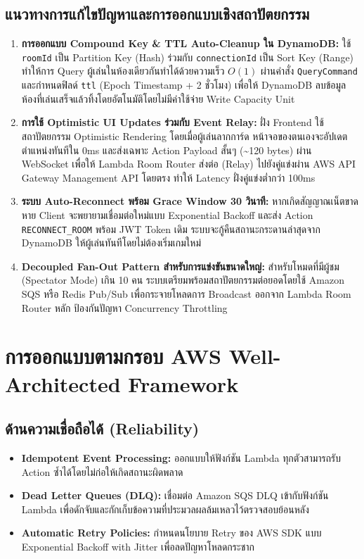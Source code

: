 \documentclass[12pt,a4paper]{report}
\begin{document}
\subsection{แนวทางการแก้ไขปัญหาและการออกแบบเชิงสถาปัตยกรรม}
\begin{enumerate}
    \item \textbf{การออกแบบ Compound Key \& TTL Auto-Cleanup ใน DynamoDB:}
    ใช้ \texttt{roomId} เป็น Partition Key (Hash) ร่วมกับ \texttt{connectionId} เป็น Sort Key (Range) ทำให้การ Query ผู้เล่นในห้องเดียวกันทำได้ด้วยความเร็ว $O(1)$ ผ่านคำสั่ง \texttt{QueryCommand} และกำหนดฟิลด์ \texttt{ttl} (Epoch Timestamp + 2 ชั่วโมง) เพื่อให้ DynamoDB ลบข้อมูลห้องที่เล่นเสร็จแล้วทิ้งโดยอัตโนมัติโดยไม่มีค่าใช้จ่าย Write Capacity Unit
    
    \item \textbf{การใช้ Optimistic UI Updates ร่วมกับ Event Relay:}
    ฝั่ง Frontend ใช้สถาปัตยกรรม Optimistic Rendering โดยเมื่อผู้เล่นลากการ์ด หน้าจอของตนเองจะอัปเดตตำแหน่งทันทีใน 0ms และส่งเฉพาะ Action Payload สั้นๆ (\textasciitilde120 bytes) ผ่าน WebSocket เพื่อให้ Lambda Room Router ส่งต่อ (Relay) ไปยังคู่แข่งผ่าน AWS API Gateway Management API โดยตรง ทำให้ Latency ฝั่งคู่แข่งต่ำกว่า 100ms
    
    \item \textbf{ระบบ Auto-Reconnect พร้อม Grace Window 30 วินาที:}
    หากเกิดสัญญาณเน็ตขาดหาย Client จะพยายามเชื่อมต่อใหม่แบบ Exponential Backoff และส่ง Action \texttt{RECONNECT\_ROOM} พร้อม JWT Token เดิม ระบบจะกู้คืนสถานะกระดานล่าสุดจาก DynamoDB ให้ผู้เล่นทันทีโดยไม่ต้องเริ่มเกมใหม่
    
    \item \textbf{Decoupled Fan-Out Pattern สำหรับการแข่งขันขนาดใหญ่:}
    สำหรับโหมดที่มีผู้ชม (Spectator Mode) เกิน 10 คน ระบบเตรียมพร้อมสถาปัตยกรรมต่อยอดโดยใช้ Amazon SQS หรือ Redis Pub/Sub เพื่อกระจายโหลดการ Broadcast ออกจาก Lambda Room Router หลัก ป้องกันปัญหา Concurrency Throttling
\end{enumerate}

\section{การออกแบบตามกรอบ AWS Well-Architected Framework}

\subsection{ด้านความเชื่อถือได้ (Reliability)}
\begin{itemize}
    \item \textbf{Idempotent Event Processing:} ออกแบบให้ฟังก์ชัน Lambda ทุกตัวสามารถรับ Action ซ้ำได้โดยไม่ก่อให้เกิดสถานะผิดพลาด
    \item \textbf{Dead Letter Queues (DLQ):} เชื่อมต่อ Amazon SQS DLQ เข้ากับฟังก์ชัน Lambda เพื่อดักจับและกักเก็บข้อความที่ประมวลผลล้มเหลวไว้ตรวจสอบย้อนหลัง
    \item \textbf{Automatic Retry Policies:} กำหนดนโยบาย Retry ของ AWS SDK แบบ Exponential Backoff with Jitter เพื่อลดปัญหาโหลดกระชาก
\end{itemize}
\end{document}
